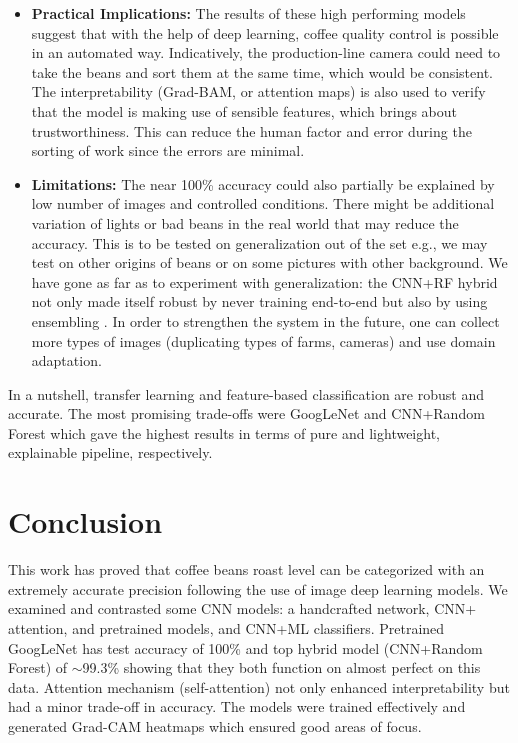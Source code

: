 \documentclass[conference]{IEEEtran}
\begin{document}
\begin{itemize}
    \item \textbf{Practical Implications:} The results of these high performing models suggest that with the help of deep learning, coffee quality control is possible in an automated way. Indicatively, the production-line camera could need to take the beans and sort them at the same time, which would be consistent. The interpretability (Grad-BAM, or attention maps) is also used to verify that the model is making use of sensible features, which brings about trustworthiness. This can reduce the human factor and error during the sorting of work since the errors are minimal.

    \item \textbf{Limitations:} The near 100\% accuracy could also partially be explained by low number of images and controlled conditions. There might be additional variation of lights or bad beans in the real world that may reduce the accuracy. This is to be tested on generalization out of the set e.g., we may test on other origins of beans or on some pictures with other background. We have gone as far as to experiment with generalization: the CNN+RF hybrid not only made itself robust by never training end-to-end but also by using ensembling \cite{OurResults2025}. In order to strengthen the system in the future, one can collect more types of images (duplicating types of farms, cameras) and use domain adaptation.
\end{itemize}

In a nutshell, transfer learning and feature-based classification are robust and accurate. The most promising trade-offs were GoogLeNet and CNN+Random Forest which gave the highest results in terms of pure and lightweight, explainable pipeline, respectively. 

\section{Conclusion}
This work has proved that coffee beans roast level can be categorized with an extremely accurate precision following the use of image deep learning models. We examined and contrasted some CNN models: a handcrafted network, CNN+ attention, and pretrained models, and CNN+ML classifiers. Pretrained GoogLeNet has test accuracy of 100\% and top hybrid model (CNN+Random Forest) of $\sim$99.3\% showing that they both function on almost perfect on this data. Attention mechanism (self-attention) not only enhanced interpretability but had a minor trade-off in accuracy. The models were trained effectively and generated Grad-CAM heatmaps which ensured good areas of focus.
\end{document}
